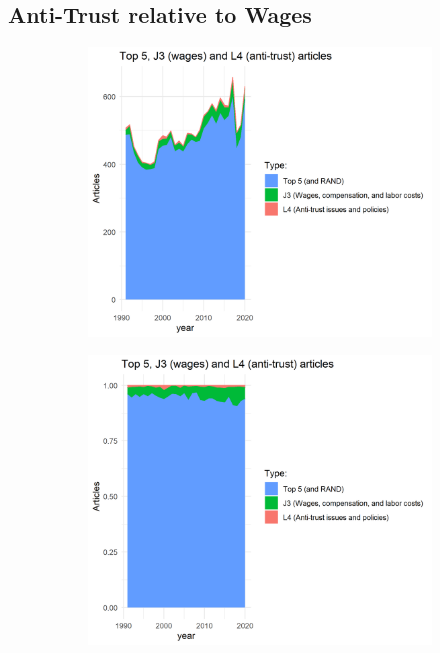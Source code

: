 \documentclass[11pt, letterpaper, twoside]{article}
\begin{document}
\subsection{Anti-Trust relative to Wages}

\begin{figure}
    \begin{subfigure}[h]{0.49\textwidth}
        \centering
        \includegraphics[width=\textwidth]{j3-l4-top5.png}
    \end{subfigure}
    \hfill
    \begin{subfigure}[h]{0.49\textwidth}
        \centering
        \includegraphics[width=\textwidth]{j3-l4-top5-normalized.png}
    \end{subfigure}
\end{figure}
\end{document}
